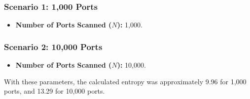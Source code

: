 \subsubsection{Scenario 1: 1,000 Ports}

\begin{itemize}
\item \textbf{Number of Ports Scanned (\(N\)):} 1,000.
\end{itemize}

\subsubsection{Scenario 2: 10,000 Ports}

\begin{itemize}
\item \textbf{Number of Ports Scanned (\(N\)):} 10,000.
\end{itemize}

With these parameters, the calculated entropy was approximately 9.96 for 1,000 ports, and 13.29 for 10,000 ports.



